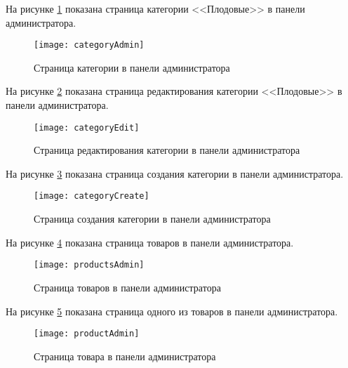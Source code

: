 На рисунке \ref{categoryAdmin:image} показана страница категории <<Плодовые>> в панели администратора.

\begin{figure}[H]
	\texttt{[image: categoryAdmin]}
	\caption{Страница категории в панели администратора}
	\label{categoryAdmin:image}
\end{figure}

На рисунке \ref{categoryEdit:image} показана страница редактирования категории <<Плодовые>> в панели администратора.

\begin{figure}[H]
	\texttt{[image: categoryEdit]}
	\caption{Страница редактирования категории в панели администратора}
	\label{categoryEdit:image}
\end{figure}

На рисунке \ref{categoryCreate:image} показана страница создания категории в панели администратора.

\begin{figure}[H]
	\texttt{[image: categoryCreate]}
	\caption{Страница создания категории в панели администратора}
	\label{categoryCreate:image}
\end{figure}


На рисунке \ref{productsAdmin:image} показана страница товаров в панели администратора.

\begin{figure}[H]
	\texttt{[image: productsAdmin]}
	\caption{Страница товаров в панели администратора}
	\label{productsAdmin:image}
\end{figure}

На рисунке \ref{productAdmin:image} показана страница одного из товаров в панели администратора.

\begin{figure}[H]
	\texttt{[image: productAdmin]}
	\caption{Страница товара в панели администратора}
	\label{productAdmin:image}
\end{figure}

